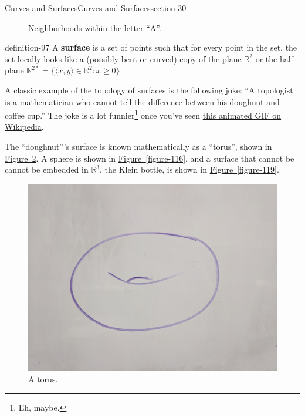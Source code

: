 \documentclass[oneside,10pt,]{article}
\newcommand{\terminology}[1]{\textbf{#1}}
\newcommand{\tuple}[1]{\langle #1 \rangle}
\newcommand{\mb}{\mathbb}
\begin{document}
\begin{sectionptx}{Curves and Surfaces}{}{Curves and Surfaces}{}{}{section-30}
\begin{figure}
\caption{Neighborhoods within the letter ``A''.\label{figure-93}}
\end{figure}
\begin{definition}{}{definition-97}%
\hypertarget{p-98}{}%
A \terminology{surface} is a set of points such that for every point in the set, the set locally looks like a (possibly bent or curved) copy of the plane \(\mathbb R^2\) or the half-plane \(\mathbb R^{2*}=\{\tuple{x,y}\in\mb R^2:x\geq 0\}\).%
\end{definition}
\hypertarget{p-102}{}%
A classic example of the topology of surfaces is the following joke: ``A topologist is a mathematician who cannot tell the difference between his doughnut and coffee cup.'' The joke is a lot funnier\footnote{Eh, maybe.\label{fn-104}} once you've seen \href{https://en.wikipedia.org/wiki/File:Mug_and_Torus_morph.gif}{this animated GIF on Wikipedia}.%
\par
\hypertarget{p-106}{}%
The ``doughnut'''s surface is known mathematically as a ``torus'', shown in \hyperref[figure-113]{Figure~\ref{figure-113}}. A sphere is shown in \hyperref[figure-116]{Figure~\ref{figure-116}}, and a surface that cannot be cannot be embedded in \(\mathbb R^3\), the Klein bottle, is shown in \hyperref[figure-119]{Figure~\ref{figure-119}}.%
\begin{figure}
\centering
\includegraphics[width=1\linewidth]{images/torus.jpg}
\caption{A torus.\label{figure-113}}
\end{figure}
\begin{figure}
\centering

\end{figure}
\end{sectionptx}
\end{document}
